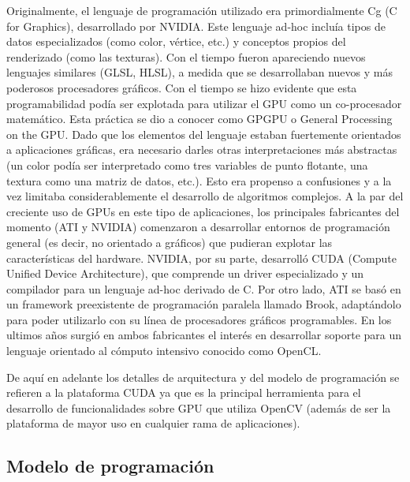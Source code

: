 \documentclass[a4paper,10pt]{report}
\begin{document}
Originalmente, el lenguaje de programación utilizado era primordialmente Cg (C for Graphics), desarrollado por NVIDIA. 
Este lenguaje ad-hoc incluía tipos de datos especializados (como color, vértice, etc.) y conceptos propios del renderizado (como las texturas). 
Con el tiempo fueron apareciendo nuevos lenguajes similares (GLSL, HLSL), a medida que se desarrollaban nuevos y más poderosos procesadores gráficos.
Con el tiempo se hizo evidente que esta programabilidad podía ser explotada para utilizar el GPU como un co-procesador matemático. 
Esta práctica se dio a conocer como GPGPU o General Processing on the GPU. 
Dado que los elementos del lenguaje estaban fuertemente orientados a aplicaciones gráficas, era necesario darles otras interpretaciones más abstractas (un color podía ser
interpretado como tres variables de punto flotante, una textura como una matriz de datos, etc.). 
Esto era propenso a confusiones y a la vez limitaba considerablemente el desarrollo de algoritmos complejos.
A la par del creciente uso de GPUs en este tipo de aplicaciones, los principales fabricantes del momento (ATI y NVIDIA) comenzaron a desarrollar entornos de programación
general (es decir, no orientado a gráficos) que pudieran explotar las características del hardware. 
NVIDIA, por su parte, desarrolló CUDA\cite{cudaDoc} (Compute Unified Device Architecture), que comprende un driver especializado y un compilador para un lenguaje ad-hoc derivado de C. 
Por otro lado, ATI se basó en un framework preexistente de programación paralela llamado Brook, adaptándolo para poder utilizarlo con su línea de procesadores gráficos programables. 
En los ultimos años surgió en ambos fabricantes el interés en desarrollar soporte para un lenguaje orientado al cómputo intensivo conocido como OpenCL\cite{openclDoc}.


De aquí en adelante los detalles de arquitectura y del modelo de programación se refieren a la plataforma CUDA ya que es la principal herramienta para el desarrollo de funcionalidades sobre GPU que utiliza OpenCV (además de ser la plataforma de mayor uso en cualquier rama de aplicaciones).


\subsection{Modelo de programación}
\end{document}
